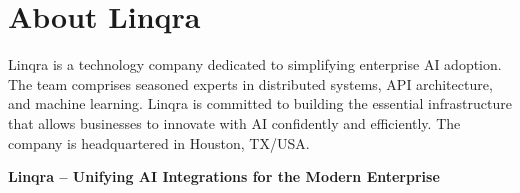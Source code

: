 \documentclass[11pt,a4paper]{article}
\begin{document}
\newpage
\section{About Linqra}
Linqra is a technology company dedicated to simplifying enterprise AI adoption. The team comprises seasoned experts in distributed systems, API architecture, and machine learning. Linqra is committed to building the essential infrastructure that allows businesses to innovate with AI confidently and efficiently. The company is headquartered in Houston, TX/USA.

\vspace{0.5cm}
\begin{center}
\textbf{Linqra -- Unifying AI Integrations for the Modern Enterprise}
\end{center}
\end{document}
